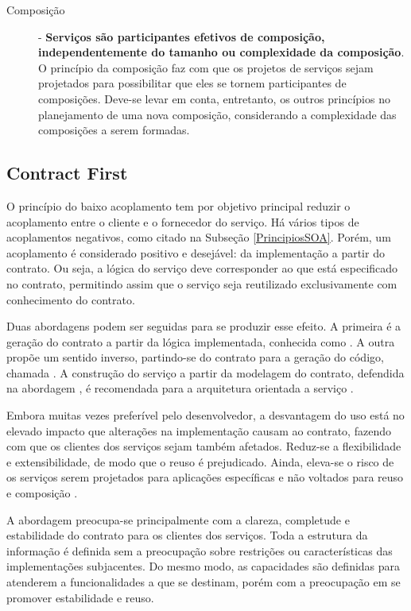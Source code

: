 \begin{description}
\item[Composição] - \textbf{Serviços são participantes efetivos de composição,
independentemente do tamanho ou complexidade da composição}. O princípio da
composição faz com que os projetos de serviços sejam projetados para
possibilitar que eles se tornem participantes de composições. Deve-se levar em
conta, entretanto, os outros princípios no planejamento de uma nova composição,
considerando a complexidade das composições a serem formadas.

\end{description}
 

\subsection{Contract First}
\label{Contract-First}
\vspace{-6mm}

O princípio do baixo acoplamento tem por objetivo principal reduzir o
acoplamento entre o cliente e o fornecedor do serviço. Há vários tipos de
acoplamentos negativos, como citado na Subseção \ref{PrincipiosSOA}. Porém, um
acoplamento é considerado positivo e desejável: da implementação a partir do contrato. Ou seja, a lógica
do serviço deve corresponder ao que está especificado no contrato, permitindo
assim que o serviço seja reutilizado exclusivamente com conhecimento do
contrato.

Duas abordagens podem ser seguidas para se produzir esse efeito. A primeira é a
geração do contrato a partir da lógica implementada, conhecida como
\CdFirst{}. A outra propõe um sentido inverso, partindo-se do contrato
para a geração do código, chamada \CtFirst{}. A construção do serviço a
partir da modelagem do contrato, defendida na abordagem \CtFirst{}, é
recomendada para a arquitetura orientada a serviço \cite{erl2009web}.

Embora muitas vezes preferível pelo desenvolvedor, a desvantagem do uso
\CdFirst{} está no elevado impacto que alterações na implementação causam ao
contrato, fazendo com que os clientes dos serviços sejam também afetados.
Reduz-se a flexibilidade e extensibilidade, de modo que o reuso é prejudicado. Ainda,
eleva-se o risco de os serviços serem projetados para aplicações específicas e
não voltados para reuso e composição \cite{karthikeyancontract}.

A abordagem \CtFirst{} preocupa-se principalmente com a clareza, completude e
estabilidade do contrato para os clientes dos serviços. Toda a
estrutura da informação é definida sem a preocupação sobre restrições ou
características das implementações subjacentes. Do mesmo modo, as
capacidades são definidas para atenderem a funcionalidades a que se destinam,
porém com a preocupação em se promover estabilidade e reuso.

